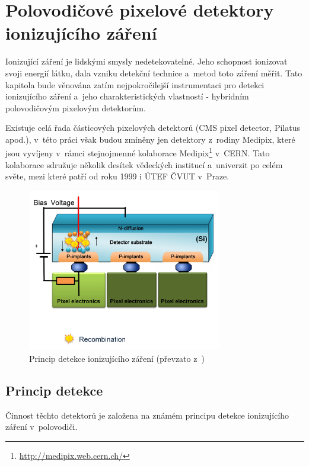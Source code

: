 

\chapter{Polovodičové pixelové detektory ionizujícího záření}\label{det}
Ionizující záření je lidskými smysly nedetekovatelné. Jeho schopnost ionizovat svoji energií látku, dala vzniku detekční technice a~metod toto záření měřit. Tato kapitola bude věnována zatím nejpokročilejší instrumentaci pro detekci ionizujícího záření a~jeho charakteristických vlastností - hybridním polovodičovým pixelovým detektorům.

Existuje celá řada částicových pixelových detektorů (CMS pixel detector, Pilatus apod.), v~této práci však budou zmíněny jen detektory z~rodiny Medipix, které jsou vyvíjeny v~rámci stejnojmenné kolaborace Medipix\footnote{\url{http://medipix.web.cern.ch/}} v~CERN. Tato kolaborace sdružuje několik desítek vědeckých institucí a~univerzit po celém světe, mezi které patří od roku 1999 i ÚTEF ČVUT v~Praze.

\begin{figure}[th!]
	\begin{center}
		\includegraphics[width=8.5cm]{figures/det_recombination.png}
		\caption{Princip detekce ionizujícího záření (převzato z~\cite{PlatkevicDisertace})}
		\label{fig:det:recomb}
	\end{center}
\end{figure}

\section{Princip detekce}
Činnost těchto detektorů je založena na známém principu detekce ionizujícího záření v~polovodiči. 

